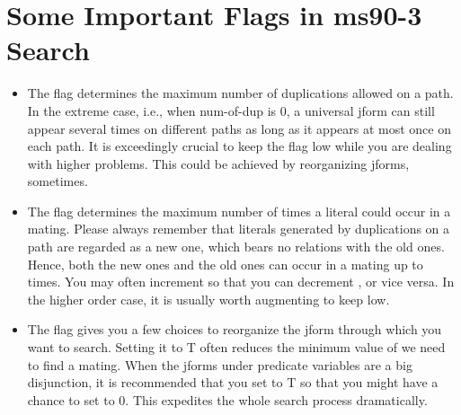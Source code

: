\section{Some Important Flags in ms90-3 Search}
\begin{itemize}
\item {}
The flag determines the maximum number of duplications allowed
on a path. In the extreme case, i.e., when num-of-dup is 0, a
universal jform can still appear several times on different paths
as long as it appears at most once on each path. It is exceedingly
crucial to keep the flag low while you are dealing with higher
problems. This could be achieved by reorganizing jforms, sometimes.

\item {} The flag determines the maximum number of times
a literal could occur in a mating. Please always remember that
literals generated by duplications on a path are regarded as a new
one, which bears no relations with the old ones. Hence, both the new
ones and the old ones can occur in a mating up to
 times. You may often increment
 so that you can decrement
, or vice versa. In the higher order case, it
is usually worth augmenting  to keep
 low.

\item {} The flag gives you a few choices to
reorganize the jform through which you want to search. Setting it to T
often reduces the minimum value of  we need to
find a mating. When the jforms under predicate variables are a big
disjunction, it is recommended that you set 
to T so that you might have a chance to set  to 0.
This expedites the whole search process dramatically.
\end{itemize}

